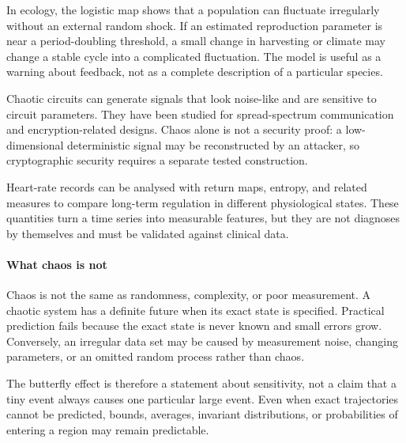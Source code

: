 In ecology, the logistic map shows that a population can fluctuate
irregularly without an external random shock. If an estimated reproduction
parameter is near a period-doubling threshold, a small change in harvesting
or climate may change a stable cycle into a complicated fluctuation. The
model is useful as a warning about feedback, not as a complete description
of a particular species.

Chaotic circuits can generate signals that look noise-like and are sensitive
to circuit parameters. They have been studied for spread-spectrum
communication and encryption-related designs. Chaos alone is not a security
proof: a low-dimensional deterministic signal may be reconstructed by an
attacker, so cryptographic security requires a separate tested construction.

Heart-rate records can be analysed with return maps, entropy, and related
measures to compare long-term regulation in different physiological states.
These quantities turn a time series into measurable features, but they are
not diagnoses by themselves and must be validated against clinical data.

\paragraph{What chaos is not}
Chaos is not the same as randomness, complexity, or poor measurement. A
chaotic system has a definite future when its exact state is specified.
Practical prediction fails because the exact state is never known and small
errors grow. Conversely, an irregular data set may be caused by measurement
noise, changing parameters, or an omitted random process rather than chaos.

The butterfly effect is therefore a statement about sensitivity, not a claim
that a tiny event always causes one particular large event. Even when exact
trajectories cannot be predicted, bounds, averages, invariant distributions,
or probabilities of entering a region may remain predictable.
\theoryapplications
{}
